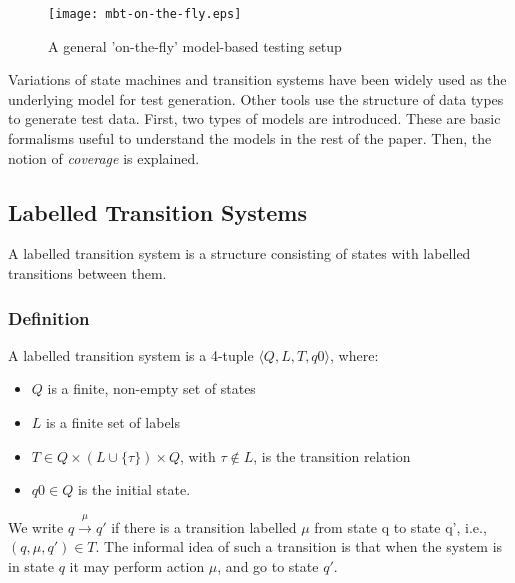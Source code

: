 \begin{figure}[h]
  \begin{center}
    \texttt{[image: mbt-on-the-fly.eps]}
  \end{center}
  \caption{A general 'on-the-fly' model-based testing setup}
  \label{fig:model_based_testing_on_the_fly}
\end{figure}

Variations of state machines and transition systems have been widely used as the underlying model for test generation. Other tools use the structure of data types to generate test data. First, two types of models are introduced. These are basic formalisms useful to understand the models in the rest of the paper. Then, the notion of \textit{coverage} is explained.

\subsection{Labelled Transition Systems}
A labelled transition system is a structure consisting of states with labelled transitions between them.

\subsubsection{Definition}
A labelled transition system is a 4-tuple	$\langle Q, L, T, q0\rangle$, where:
\begin{itemize}
\item $Q$ is a finite, non-empty set of states
\item $L$ is a finite set of labels
\item $T \in Q \times (L \cup \{\tau\}) \times Q$, with $\tau \notin L$, is the transition relation
\item $q0 \in Q$ is the initial state.
\end{itemize}
We write $q \xrightarrow{\mu}q'$ if there is a transition labelled $\mu$ from state q to state q', i.e., $(q, μ, q') \in T$. The informal idea of such a transition is that when the system is in state $q$ it may perform action $\mu$, and go to state $q'$. 


